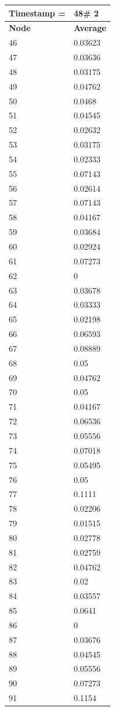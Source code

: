 \begin{tabular}{|l||l|}
\hline
\textbf{Timestamp =} & \textbf{48}\# 2\\\hline
	\textbf{Node} & \textbf{Average} \\ \hline
\hline
	46 & 0.03623 \\ \hline
	47 & 0.03636 \\ \hline
	48 & 0.03175 \\ \hline
	49 & 0.04762 \\ \hline
	50 & 0.0468 \\ \hline
	51 & 0.04545 \\ \hline
	52 & 0.02632 \\ \hline
	53 & 0.03175 \\ \hline
	54 & 0.02333 \\ \hline
	55 & 0.07143 \\ \hline
	56 & 0.02614 \\ \hline
	57 & 0.07143 \\ \hline
	58 & 0.04167 \\ \hline
	59 & 0.03684 \\ \hline
	60 & 0.02924 \\ \hline
	61 & 0.07273 \\ \hline
	62 & 0 \\ \hline
	63 & 0.03678 \\ \hline
	64 & 0.03333 \\ \hline
	65 & 0.02198 \\ \hline
	66 & 0.06593 \\ \hline
	67 & 0.08889 \\ \hline
	68 & 0.05 \\ \hline
	69 & 0.04762 \\ \hline
	70 & 0.05 \\ \hline
	71 & 0.04167 \\ \hline
	72 & 0.06536 \\ \hline
	73 & 0.05556 \\ \hline
	74 & 0.07018 \\ \hline
	75 & 0.05495 \\ \hline
	76 & 0.05 \\ \hline
	77 & 0.1111 \\ \hline
	78 & 0.02206 \\ \hline
	79 & 0.01515 \\ \hline
	80 & 0.02778 \\ \hline
	81 & 0.02759 \\ \hline
	82 & 0.04762 \\ \hline
	83 & 0.02 \\ \hline
	84 & 0.03557 \\ \hline
	85 & 0.0641 \\ \hline
	86 & 0 \\ \hline
	87 & 0.03676 \\ \hline
	88 & 0.04545 \\ \hline
	89 & 0.05556 \\ \hline
	90 & 0.07273 \\ \hline
	91 & 0.1154 \\ \hline
\end{tabular}

